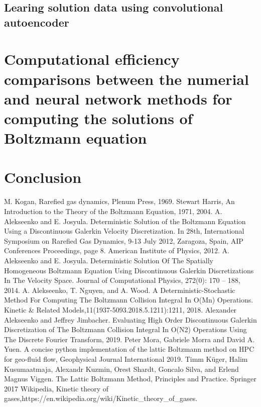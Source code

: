 \documentclass{article}
\begin{document}
\subsection{Learing solution data using convolutional autoencoder}

\section{Computational efficiency comparisons between the numerial and neural network methods for computing the solutions of Boltzmann equation } \label{Comparisons}
\section{Conclusion} \label{Conclusion}

\begin{thebibliography}{99}
	M. Kogan, Rarefied gas dynamics, Plenum Press, 1969.
	Stewart Harris, An Introduction to the Theory of the Boltzmann Equation, 1971, 2004.
	A. Alekseenko and E. Josyula.  Deterministic Solution of the Boltzmann Equation Using a Discontinuous Galerkin Velocity Discretization. In 28th, International Symposium on Rarefied Gas Dynamics, 9-13 July 2012, Zaragoza, Spain, AIP Conferences Proceedings, page 8. American Institute of Physics, 2012.
	A. Alekseenko and E. Josyula.  Deterministic Solution Of The Spatially Homogeneous Boltzmann Equation Using Discontinuous Galerkin Discretizations In The Velocity Space. Journal of Computational Physics, 272(0): 170 – 188, 2014.
	A. Alekseenko, T. Nguyen, and A. Wood. A Deterministic-Stochastic Method For Computing The Boltzmann Collision Integral In O(Mn) Operations. Kinetic \& Related Models,11(1937-5093.2018.5.1211):1211, 2018.
	Alexander Alekseenko and Jeffrey Jimbacher. Evaluating High Order Discontinuous Galerkin Discretization of The Boltzmann Collision Integral In O(N2) Operations Using The Discrete Fourier Transform, 2019.
	 Peter Mora, Gabriele Morra and David A. Yuen. A concise python implementation of the lattic Boltzmann method on HPC for geo-fluid flow, Geophysical Journal International 2019.
	 Timm K\"{u}ger, Halim Kusumaatmaja, Alexandr Kuzmin, Orest Shardt, Goncalo Silva, and Erlend Magnus Viggen. The Lattic Boltzmann Method, Principles and Practice. Springer 2017
	Wikipedia, Kinetic theory of gases,https://en.wikipedia.org/wiki/Kinetic\_theory\_of\_gases.

\end{thebibliography}
\end{document}
